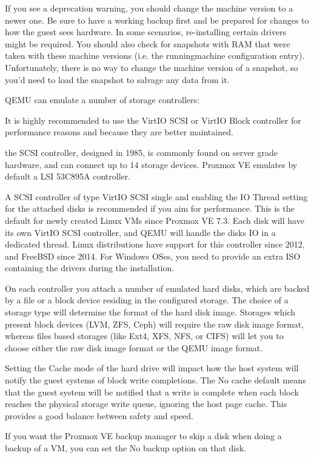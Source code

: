 If you see a deprecation warning, you should change the machine version to a newer one. Be sure to have a working backup first and be prepared for changes to how the guest sees hardware. In some scenarios, re-installing certain drivers might be required. You should also check for snapshots with RAM that were taken with these machine versions (i.e. the runningmachine configuration entry). Unfortunately, there is no way to change the machine version of a snapshot, so you’d need to load the snapshot to salvage any data from it.

QEMU can emulate a number of storage controllers:

It is highly recommended to use the VirtIO SCSI or VirtIO Block controller for performance reasons and because they are better maintained.

the SCSI controller, designed in 1985, is commonly found on server grade hardware, and can connect up to 14 storage devices. Proxmox VE emulates by default a LSI 53C895A controller.

A SCSI controller of type VirtIO SCSI single and enabling the IO Thread setting for the attached disks is recommended if you aim for performance. This is the default for newly created Linux VMs since Proxmox VE 7.3. Each disk will have its own VirtIO SCSI controller, and QEMU will handle the disks IO in a dedicated thread. Linux distributions have support for this controller since 2012, and FreeBSD since 2014. For Windows OSes, you need to provide an extra ISO containing the drivers during the installation.

On each controller you attach a number of emulated hard disks, which are backed by a file or a block device residing in the configured storage. The choice of a storage type will determine the format of the hard disk image. Storages which present block devices (LVM, ZFS, Ceph) will require the raw disk image format, whereas files based storages (like Ext4, XFS, NFS, or CIFS) will let you to choose either the raw disk image format or the QEMU image format.

Setting the Cache mode of the hard drive will impact how the host system will notify the guest systems of block write completions. The No cache default means that the guest system will be notified that a write is complete when each block reaches the physical storage write queue, ignoring the host page cache. This provides a good balance between safety and speed.

If you want the Proxmox VE backup manager to skip a disk when doing a backup of a VM, you can set the No backup option on that disk.

